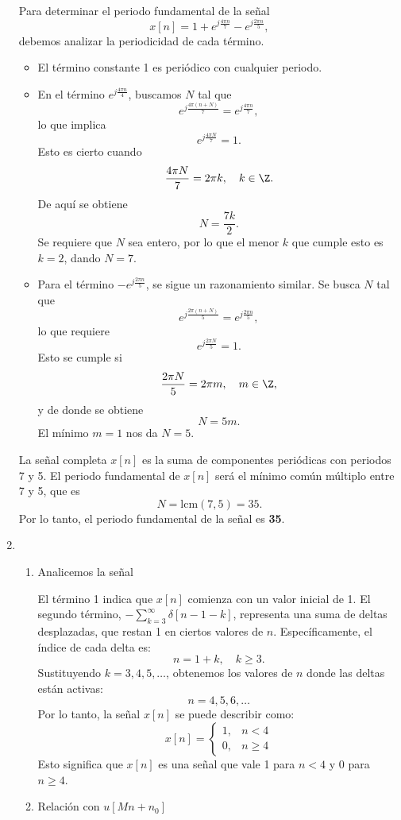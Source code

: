 \begin{enumerate}[label=\color{red}\textbf{\arabic*)}]
      Para determinar el periodo fundamental de la señal \[x[n]=1+e^{j\frac{4\pi n}{7}}-e^{j\frac{2\pi n}{5} },\] debemos analizar la periodicidad de cada término.
       \begin{itemize}[label=\textbullet]
          \item El término constante 1 es periódico con cualquier periodo.
          \item En el término $e^{j\frac{4\pi n}{4} } $, buscamos $N$ tal que \[
          e^{j\frac{4\pi(n+N)}{7} } =e^{j\frac{4\pi n}{7} } ,
          \] lo que implica \[
          e^{j\frac{4\pi N}{7} } =1.
          \] 
          Esto es cierto cuando \[
          \dfrac{4\pi N}{7}=2\pi k,\quad k\in \Z.
          \] 
          De aquí se obtiene \[
          N=\dfrac{7k}{2}.
          \] 
          Se requiere que $N$ sea entero, por lo que el menor $k$ que cumple esto es $k=2$, dando $N=7$.
      \item Para el término  $-e^{j\frac{2\pi n}{5} } $, se sigue un razonamiento similar. Se busca $N$ tal que \[
      e^{j\frac{2\pi(n+N)}{5} } =e^{j\frac{2\pi n}{5} } ,
      \] lo que requiere \[
      e^{j\frac{2\pi N}{5} } =1.
      \] 
      Esto se cumple si \[
      \dfrac{2\pi N}{5}=2\pi m,\quad m\in \Z,
      \] y de donde se obtiene \[
      N=5m.
      \] El mínimo $m=1$ nos da  $N=5$.
      \end{itemize}
      La señal completa $x[n]$ es la suma de componentes periódicas con periodos 7 y 5. El periodo fundamental de  $x[n]$ será el mínimo común múltiplo entre 7 y 5, que es  \[
      N=\mathrm{lcm}(7,5)=35.
      \] 
      Por lo tanto, el periodo fundamental de la señal es \textbf{35}. 
  \item {} 

      \begin{enumerate}[label=Paso \arabic*:]
          \item Analicemos la señal

              El término 1 indica que $x[n]$ comienza con un valor inicial de 1. El segundo término, $-\sum_{k=3}^{\infty} \delta[n-1-k]$, representa una suma de deltas desplazadas, que restan 1 en ciertos valores de $n$. Específicamente, el índice de cada delta es: \[
              n=1+k,\quad k\ge 3.
              \] 
              Sustituyendo $k=3,4,5,\dots$, obtenemos los valores de $n$ donde las deltas están activas: \[
              n=4,5,6,\dots
              \] 
              Por lo tanto, la señal $x[n]$ se puede describir como:  \[
                  x[n]=\begin{cases}
                      1, & n<4\\
                      0, & n\ge 4
                  \end{cases}
              \] 
              Esto significa que $x[n]$ es una señal que vale 1 para  $n<4$ y 0 para  $n\ge 4$.
          \item Relación con $u[Mn+n_0]$


\end{enumerate}
\end{enumerate}
